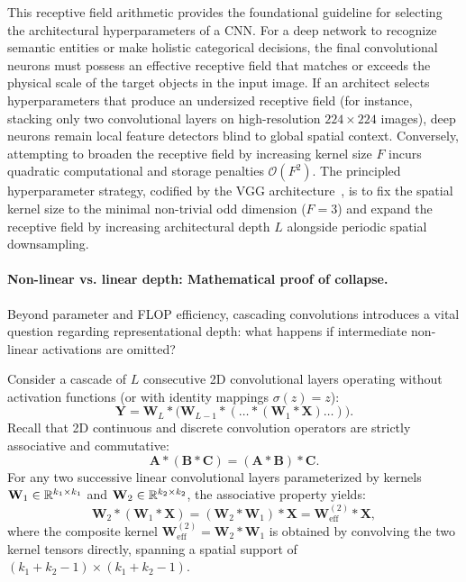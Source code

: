 This receptive field arithmetic provides the foundational guideline for selecting the architectural hyperparameters of a CNN. For a deep network to recognize semantic entities or make holistic categorical decisions, the final convolutional neurons must possess an effective receptive field that matches or exceeds the physical scale of the target objects in the input image. If an architect selects hyperparameters that produce an undersized receptive field (for instance, stacking only two convolutional layers on high-resolution $224 \times 224$ images), deep neurons remain local feature detectors blind to global spatial context. Conversely, attempting to broaden the receptive field by increasing kernel size $F$ incurs quadratic computational and storage penalties $\mathcal{O}(F^2)$. The principled hyperparameter strategy, codified by the VGG architecture~\cite{simonyan2014very}, is to fix the spatial kernel size to the minimal non-trivial odd dimension ($F = 3$) and expand the receptive field by increasing architectural depth $L$ alongside periodic spatial downsampling.

\paragraph{Non-linear vs. linear depth: Mathematical proof of collapse.}
Beyond parameter and FLOP efficiency, cascading convolutions introduces a vital question regarding representational depth: what happens if intermediate non-linear activations are omitted?

Consider a cascade of $L$ consecutive 2D convolutional layers operating without activation functions (or with identity mappings $\sigma(z) = z$):
\begin{equation}
\mathbf{Y} = \mathbf{W}_L * \big( \mathbf{W}_{L-1} * ( \dots * (\mathbf{W}_1 * \mathbf{X}) \dots ) \big).
\end{equation}
Recall that 2D continuous and discrete convolution operators are strictly associative and commutative:
\begin{equation}
\mathbf{A} * (\mathbf{B} * \mathbf{C}) = (\mathbf{A} * \mathbf{B}) * \mathbf{C}.
\end{equation}
For any two successive linear convolutional layers parameterized by kernels $\mathbf{W}_1 \in \mathbb{R}^{k_1 \times k_1}$ and $\mathbf{W}_2 \in \mathbb{R}^{k_2 \times k_2}$, the associative property yields:
\begin{equation}
\mathbf{W}_2 * (\mathbf{W}_1 * \mathbf{X}) = (\mathbf{W}_2 * \mathbf{W}_1) * \mathbf{X} = \mathbf{W}_{\text{eff}}^{(2)} * \mathbf{X},
\end{equation}
where the composite kernel $\mathbf{W}_{\text{eff}}^{(2)} = \mathbf{W}_2 * \mathbf{W}_1$ is obtained by convolving the two kernel tensors directly, spanning a spatial support of $(k_1 + k_2 - 1) \times (k_1 + k_2 - 1)$. 

